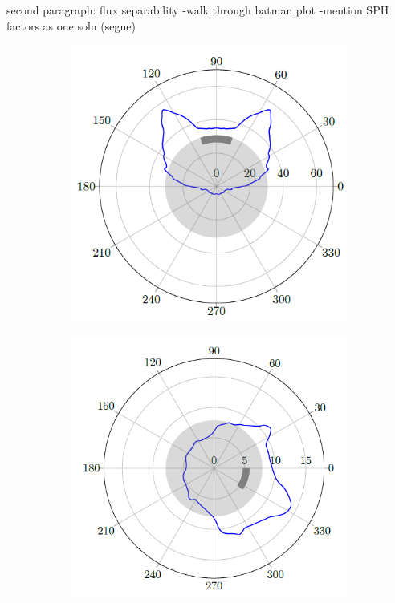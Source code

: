 second paragraph: flux separability
-walk through batman plot
-mention SPH factors as one soln (segue)

\begin{figure}[H]
\begin{subfigure}{.5\textwidth}
  \centering
  \includegraphics[width=\linewidth]{figures/sph/batman-1}
  \caption{}
\end{subfigure}
\begin{subfigure}{.5\textwidth}
  \centering
  \includegraphics[width=\linewidth]{figures/sph/batman-2}

\end{subfigure}
\end{figure}
